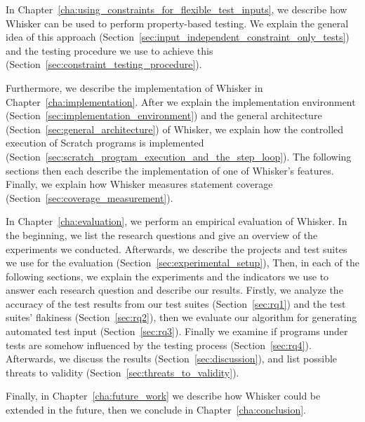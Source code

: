 In Chapter~\ref{cha:using_constraints_for_flexible_test_inputs}, we describe how Whisker can be used to perform property-based testing.
We explain the general idea of this approach (Section~\ref{sec:input_independent_constraint_only_tests})
and the testing procedure we use to achieve this (Section~\ref{sec:constraint_testing_procedure}).
\parspace

Furthermore, we describe the implementation of Whisker in Chapter~\ref{cha:implementation}.
After we explain the implementation environment (Section~\ref{sec:implementation_environment})
and the general architecture (Section~\ref{sec:general_architecture}) of Whisker,
we explain how the controlled execution of Scratch programs is implemented (Section~\ref{sec:scratch_program_execution_and_the_step_loop}).
The following sections then each describe the implementation of one of Whisker's features.
Finally, we explain how Whisker measures statement coverage (Section~\ref{sec:coverage_measurement}).
\parspace

In Chapter~\ref{cha:evaluation}, we perform an empirical evaluation of Whisker.
In the beginning, we list the research questions and give an overview of the experiments we conducted.
Afterwards, we describe the projects and test suites we use for the evaluation (Section~\ref{sec:experimental_setup}),
Then, in each of the following sections,
we explain the experiments and the indicators we use to answer each research question and describe our results.
Firstly, we analyze the accuracy of the test results from our test suites (Section~\ref{sec:rq1}) and the test suites' flakiness (Section~\ref{sec:rq2}),
then we evaluate our algorithm for generating automated test input (Section~\ref{sec:rq3}).
Finally we examine if programs under tests are somehow influenced by the testing process (Section~\ref{sec:rq4}).
Afterwards, we discuss the results (Section~\ref{sec:discussion}),
and list possible threats to validity (Section~\ref{sec:threats_to_validity}).
\parspace

Finally, in Chapter~\ref{cha:future_work} we describe how Whisker could be extended in the future,
then we conclude in Chapter~\ref{cha:conclusion}.

%
